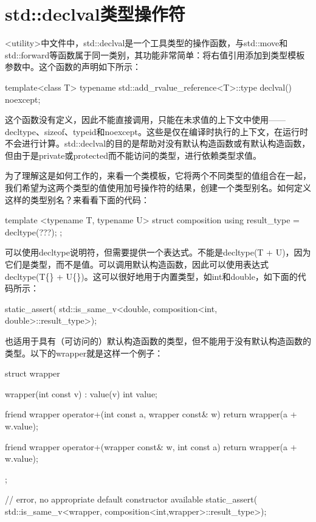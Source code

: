 \section{std::declval类型操作符}
<utility>中文件中，std::declval是一个工具类型的操作函数，与std::move和std::forward等函数属于同一类别，其功能非常简单：将右值引用添加到类型模板参数中。这个函数的声明如下所示：

\begin{cppcode}
template<class T>
typename std::add_rvalue_reference<T>::type declval() noexcept;
\end{cppcode}

这个函数没有定义，因此不能直接调用，只能在未求值的上下文中使用——decltype、sizeof、typeid和noexcept。这些是仅在编译时执行的上下文，在运行时不会进行计算。std::declval的目的是帮助对没有默认构造函数或有默认构造函数，但由于是private或protected而不能访问的类型，进行依赖类型求值。

为了理解这是如何工作的，来看一个类模板，它将两个不同类型的值组合在一起，我们希望为这两个类型的值使用加号操作符的结果，创建一个类型别名。如何定义这样的类型别名？来看看下面的代码：

\begin{cppcode}
template <typename T, typename U>
struct composition
{
	using result_type = decltype(???);
};
\end{cppcode}

可以使用decltype说明符，但需要提供一个表达式。不能是decltype(T + U)，因为它们是类型，而不是值。可以调用默认构造函数，因此可以使用表达式decltype(T\{\} + U\{\})。这可以很好地用于内置类型，如int和double，如下面的代码所示：

\begin{cppcode}
static_assert(
	std::is_same_v<double,
		composition<int, double>::result_type>);
\end{cppcode}

也适用于具有（可访问的）默认构造函数的类型，但不能用于没有默认构造函数的类型。以下的wrapper就是这样一个例子：

\begin{cppcode}
struct wrapper
{
	wrapper(int const v) : value(v){}
	int value;
	
	friend wrapper operator+(int const a, wrapper const& w)
	{
		return wrapper(a + w.value);
	}

	friend wrapper operator+(wrapper const& w, int const a)
	{
		return wrapper(a + w.value);
	}
};

// error, no appropriate default constructor available
static_assert(
	std::is_same_v<wrapper,
		composition<int,wrapper>::result_type>);
\end{cppcode}

